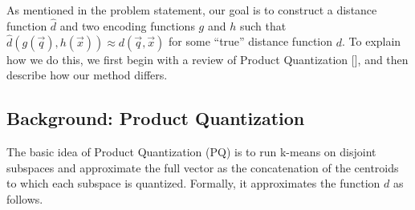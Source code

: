 
As mentioned in the problem statement, our goal is to construct a distance function $\hat{d}$ and two encoding functions $g$ and $h$ such that $\hat{d}(g(\vec{q}), h(\vec{x})) \approx d(\vec{q}, \vec{x})$ for some ``true'' distance function $d$. To explain how we do this, we first begin with a review of Product Quantization [], and then describe how our method differs.

\subsection{Background: Product Quantization}

The basic idea of Product Quantization (PQ) is to run k-means on disjoint subspaces and approximate the full vector as the concatenation of the centroids to which each subspace is quantized. Formally, it approximates the function $d$ as follows.

